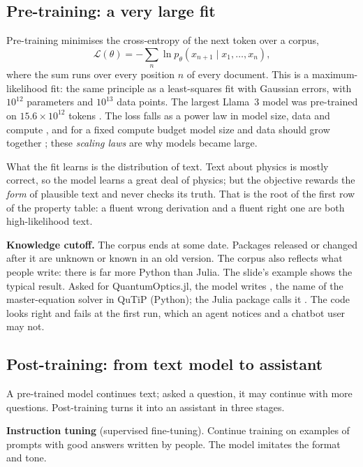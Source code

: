 \subsection{Pre-training: a very large fit}

Pre-training minimises the cross-entropy of the next token over a corpus,
\begin{equation}
  \mathcal{L}(\theta) = -\sum_{n} \ln p_\theta(x_{n+1} \mid x_1, \ldots, x_n),
\end{equation}
where the sum runs over every position $n$ of every document. This is a maximum-likelihood
fit: the same principle as a least-squares fit with Gaussian errors, with $10^{12}$
parameters and $10^{13}$ data points. The largest Llama~3 model was pre-trained on
$15.6 \times 10^{12}$ tokens . The loss falls as a power law in model size,
data and compute , and for a fixed compute budget model size and data should
grow together ; these \emph{scaling laws} are why models became large.

What the fit learns is the distribution of text. Text about physics is mostly correct, so
the model learns a great deal of physics; but the objective rewards the \emph{form} of
plausible text and never checks its truth. That is the root of the first row of the
property table: a fluent wrong derivation and a fluent right one are both high-likelihood
text.

\textbf{Knowledge cutoff.} The corpus ends at some date. Packages released or changed
after it are unknown or known in an old version. The corpus also reflects what people
write: there is far more Python than Julia. The slide's example shows the typical
result. Asked for QuantumOptics.jl, the model writes , the name of the
master-equation solver in QuTiP (Python); the Julia package calls it
 . The code looks right and fails at
the first run, which an agent notices and a chatbot user may not.

\subsection{Post-training: from text model to assistant}

A pre-trained model continues text; asked a question, it may continue with more
questions. Post-training turns it into an assistant in three stages.

\textbf{Instruction tuning} (supervised fine-tuning). Continue training on examples of
prompts with good answers written by people. The model imitates the format and tone.

